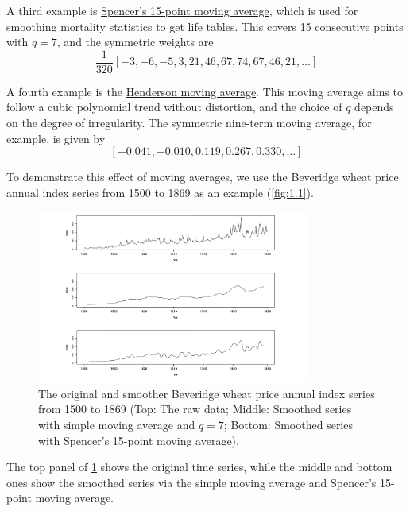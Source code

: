 A third example is \underline{Spencer's 15-point moving average}, which is used for smoothing mortality statistics to get life tables. This covers 15 consecutive points with $q = 7$, and the symmetric weights are 
\[ \frac{1}{320} [ -3,-6,-5,3,21,46,67,74,67,46,21,\dots ] \]

A fourth example is the \underline{Henderson moving average}. This moving average aims to follow a cubic polynomial trend without distortion, and the choice of $q$ depends on the degree of irregularity. The symmetric nine-term moving average, for example, is given by
\[ [-0.041, -0.010, 0.119, 0.267, 0.330, \dots] \]

To demonstrate this effect of moving averages, we use the Beveridge wheat price annual index series from 1500 to 1869 as an example (\cref{fig:1.1}).

\begin{figure}[ht]
	\centering
	\includegraphics[width=0.8\textwidth]{Chapter 2/fig2-1.png}
	\caption{The original and smoother Beveridge wheat price annual index series from 1500 to 1869 (Top: The raw data; Middle: Smoothed series with simple moving average and $q=7$; Bottom: Smoothed series with Spencer's 15-point moving average).}
	\label{fig:2.1}
\end{figure}

The top panel of \cref{fig:2.1} shows the original time series, while the middle and bottom ones show the smoothed series via the simple moving average and Spencer's 15-point moving average.

